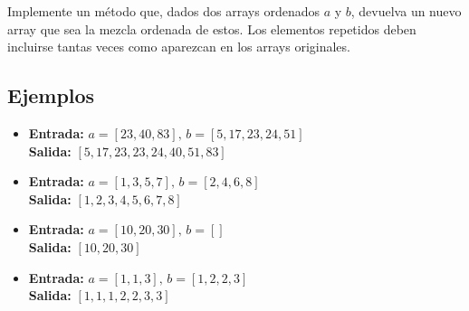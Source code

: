 Implemente un método que, dados dos arrays ordenados \(a\) y \(b\), devuelva un nuevo array que sea la mezcla ordenada de estos. Los elementos repetidos deben incluirse tantas veces como aparezcan en los arrays originales.

\subsection*{Ejemplos}

\begin{itemize}
    \item \textbf{Entrada:} \(a = [23, 40, 83], \, b = [5, 17, 23, 24, 51]\)\\
    \textbf{Salida:} \([5, 17, 23, 23, 24, 40, 51, 83]\)\\

    \item \textbf{Entrada:} \(a = [1, 3, 5, 7], \, b = [2, 4, 6, 8]\)\\
    \textbf{Salida:} \([1, 2, 3, 4, 5, 6, 7, 8]\)\\

    \item \textbf{Entrada:} \(a = [10, 20, 30], \, b = []\)\\
    \textbf{Salida:} \([10, 20, 30]\)\\

    \item \textbf{Entrada:} \(a = [1, 1, 3], \, b = [1, 2, 2, 3]\)\\
    \textbf{Salida:} \([1, 1, 1, 2, 2, 3, 3]\)\\
\end{itemize}
